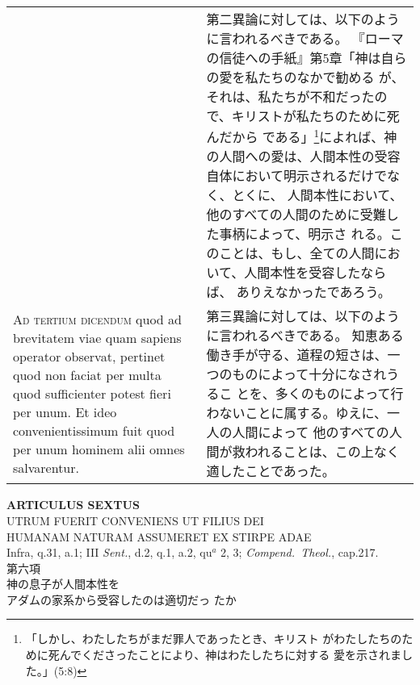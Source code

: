 \documentclass[10pt]{jsarticle} %
\begin{document}
\begin{longtable}{p{21em}p{21em}}
&

第二異論に対しては、以下のように言われるべきである。
『ローマの信徒への手紙』第5章「神は自らの愛を私たちのなかで勧める
 が、それは、私たちが不和だったので、キリストが私たちのために死んだから
 である」\footnote{「しかし、わたしたちがまだ罪人であったとき、キリスト
 がわたしたちのために死んでくださったことにより、神はわたしたちに対する
 愛を示されました。」(5:8)}によれば、神の人間への愛は、人間本性の受容自体において明示されるだけでなく、とくに、
 人間本性において、他のすべての人間のために受難した事柄によって、明示さ
 れる。このことは、もし、全ての人間において、人間本性を受容したならば、
 ありえなかったであろう。



\\



{\scshape Ad tertium dicendum} quod ad brevitatem viae quam sapiens operator
observat, pertinet quod non faciat per multa quod sufficienter potest
fieri per unum. Et ideo convenientissimum fuit quod per unum hominem
alii omnes salvarentur.


&

第三異論に対しては、以下のように言われるべきである。
知恵ある働き手が守る、道程の短さは、一つのものによって十分になされうるこ
 とを、多くのものによって行わないことに属する。ゆえに、一人の人間によって
 他のすべての人間が救われることは、この上なく適したことであった。

\end{longtable}
\newpage




\begin{center}
 {\Large {\bf ARTICULUS SEXTUS}}\\
 {\large UTRUM FUERIT CONVENIENS UT FILIUS DEI \\HUMANAM NATURAM ASSUMERET
 EX STIRPE ADAE}\\
 {\footnotesize Infra, q.31, a.1; III {\itshape Sent.}, d.2, q.1, a.2,
 qu$^a$ 2, 3; {\itshape Compend.~Theol.}, cap.217.}\\
 {\Large 第六項\\神の息子が人間本性を\\アダムの家系から受容したのは適切だっ
 たか}
\end{center}
\end{document}
